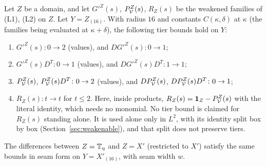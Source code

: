 \begin{lemma}\label{lem:lift}
Let $Z$ be a domain, and let $G'^Z(s)$, $P^Z_\mathcal V(s)$, $R_Z(s)$ be the weakened families of (L1), (L2) on $Z$. Let $Y=Z_{(16)}$. With radius $16$ and constants $C(\kappa,\delta)$ at $\kappa$ (the families being evaluated at $\kappa+\delta$), the following tier bounds hold on $Y$:
\begin{enumerate}[label=(Z\arabic*)]
\item $G'^Z(s)\colon0\to2$ (values), and $DG'^Z(s)\colon0\to1$;
\item $G'^Z(s)D^T\colon0\to1$ (values), and $DG'^Z(s)D^T\colon1\to1$;
\item $P^Z_\mathcal V(s)$, $P^Z_\mathcal V(s)D^T\colon0\to2$ (values), and $DP^Z_\mathcal V(s)$, $DP^Z_\mathcal V(s)D^T\colon0\to1$;
\item $R_Z(s)\colon t\to t$ for $t\le2$. Here, inside products, $R_Z(s)=\mathbf 1_Z-P^Z_\mathcal V(s)$ with the literal identity, which needs no monomial. No tier bound is claimed for $R_Z(s)$ standing alone. It is used alone only in $L^2$, with its identity split box by box (Section~\ref{sec:weakenable}), and that split does not preserve tiers.
\end{enumerate}
The differences between $Z=\mathbb T_\eta$ and $Z=X'$ (restricted to $X'$) satisfy the same bounds in seam form on $Y=X'_{(16)}$, with seam width $w$.
\end{lemma}

